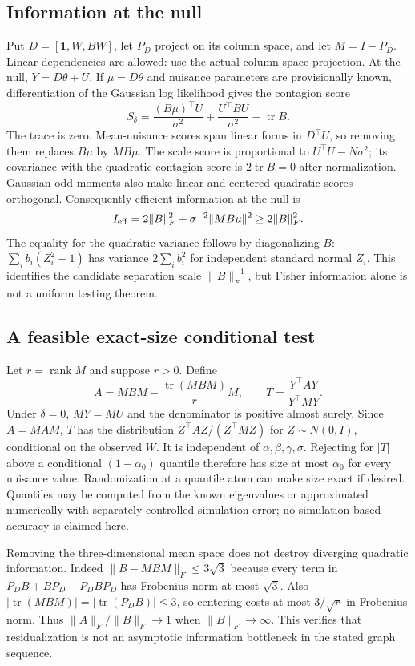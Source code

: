 \documentclass[11pt]{article}
\begin{document}
\subsection*{Information at the null}
Put $D=[\mathbf1,W,BW]$, let $P_D$ project on its column space, and let
$M=I-P_D$. Linear dependencies are allowed: use the actual column-space
projection. At the null, $Y=D\theta+U$. If $\mu=D\theta$ and nuisance
parameters are provisionally known, differentiation of the Gaussian log
likelihood gives the contagion score
\[
 S_\delta=\frac{(B\mu)^\top U}{\sigma^2}
           +\frac{U^\top BU}{\sigma^2}-\operatorname{tr}B.
\]
The trace is zero. Mean-nuisance scores span linear forms in $D^\top U$,
so removing them replaces $B\mu$ by $MB\mu$. The scale score is
proportional to $U^\top U-N\sigma^2$; its covariance with the quadratic
contagion score is $2\operatorname{tr}B=0$ after normalization.
Gaussian odd moments also make linear and centered quadratic scores
orthogonal. Consequently efficient information at the null is
\[
 I_{\rm eff}=2\|B\|_F^2+\sigma^{-2}\|MB\mu\|^2
 \geq2\|B\|_F^2.
\]
The equality for the quadratic variance follows by diagonalizing $B$:
$\sum_i b_i(Z_i^2-1)$ has variance $2\sum_i b_i^2$ for independent
standard normal $Z_i$. This identifies the candidate separation scale
$\|B\|_F^{-1}$, but Fisher information alone is not a uniform testing theorem.

\subsection*{A feasible exact-size conditional test}
Let $r=\operatorname{rank}M$ and suppose $r>0$. Define
\[
 A=MBM-\frac{\operatorname{tr}(MBM)}rM,\qquad
 T=\frac{Y^\top AY}{Y^\top MY}.
\]
Under $\delta=0$, $MY=MU$ and the denominator is positive almost surely.
Since $A=MAM$, $T$ has the distribution
$Z^\top AZ/(Z^\top MZ)$ for $Z\sim N(0,I)$, conditional on the observed
$W$. It is independent of $\alpha,\beta,\gamma,\sigma$. Rejecting for
$|T|$ above a conditional $(1-\alpha_0)$ quantile therefore has size at
most $\alpha_0$ for every nuisance value. Randomization at a quantile
atom can make size exact if desired. Quantiles may be computed from the
known eigenvalues or approximated numerically with separately controlled
simulation error; no simulation-based accuracy is claimed here.

Removing the three-dimensional mean space does not destroy diverging
quadratic information. Indeed $\|B-MBM\|_F\leq3\sqrt3$ because every
term in $P_DB+BP_D-P_DBP_D$ has Frobenius norm at most $\sqrt3$.
Also $|\operatorname{tr}(MBM)|=|\operatorname{tr}(P_DB)|\leq3$, so
centering costs at most $3/\sqrt r$ in Frobenius norm. Thus
$\|A\|_F/\|B\|_F\to1$ when $\|B\|_F\to\infty$.
This verifies that residualization is not an asymptotic information
bottleneck in the stated graph sequence.
\end{document}
